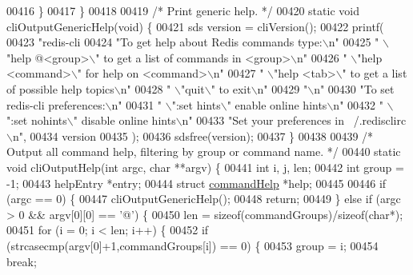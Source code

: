 \begin{DoxyCode}
{{{{{{{{{{{00416     \}
00417 \}
00418 
00419 \textcolor{comment}{/* Print generic help. */}
00420 \textcolor{keyword}{static} \textcolor{keywordtype}{void} cliOutputGenericHelp(\textcolor{keywordtype}{void}) \{
00421     sds version = cliVersion();
00422     printf(
00423         \textcolor{stringliteral}{"redis-cli %
00424         \textcolor{stringliteral}{"To get help about Redis commands type:\(\backslash\)n"}
00425         \textcolor{stringliteral}{"      \(\backslash\)"help @<group>\(\backslash\)" to get a list of commands in <group>\(\backslash\)n"}
00426         \textcolor{stringliteral}{"      \(\backslash\)"help <command>\(\backslash\)" for help on <command>\(\backslash\)n"}
00427         \textcolor{stringliteral}{"      \(\backslash\)"help <tab>\(\backslash\)" to get a list of possible help topics\(\backslash\)n"}
00428         \textcolor{stringliteral}{"      \(\backslash\)"quit\(\backslash\)" to exit\(\backslash\)n"}
00429         \textcolor{stringliteral}{"\(\backslash\)n"}
00430         \textcolor{stringliteral}{"To set redis-cli preferences:\(\backslash\)n"}
00431         \textcolor{stringliteral}{"      \(\backslash\)":set hints\(\backslash\)" enable online hints\(\backslash\)n"}
00432         \textcolor{stringliteral}{"      \(\backslash\)":set nohints\(\backslash\)" disable online hints\(\backslash\)n"}
00433         \textcolor{stringliteral}{"Set your preferences in ~/.redisclirc\(\backslash\)n"},
00434         version
00435     );
00436     sdsfree(version);
00437 \}
00438 
00439 \textcolor{comment}{/* Output all command help, filtering by group or command name. */}
00440 \textcolor{keyword}{static} \textcolor{keywordtype}{void} cliOutputHelp(\textcolor{keywordtype}{int} argc, \textcolor{keywordtype}{char} **argv) \{
00441     \textcolor{keywordtype}{int} i, j, len;
00442     \textcolor{keywordtype}{int} group = -1;
00443     helpEntry *entry;
00444     \textcolor{keyword}{struct} \hyperlink{structcommandHelp}{commandHelp} *help;
00445 
00446     \textcolor{keywordflow}{if} (argc == 0) \{
00447         cliOutputGenericHelp();
00448         \textcolor{keywordflow}{return};
00449     \} \textcolor{keywordflow}{else} \textcolor{keywordflow}{if} (argc > 0 && argv[0][0] == \textcolor{stringliteral}{'@'}) \{
00450         len = \textcolor{keyword}{sizeof}(commandGroups)/\textcolor{keyword}{sizeof}(\textcolor{keywordtype}{char}*);
00451         \textcolor{keywordflow}{for} (i = 0; i < len; i++) \{
00452             \textcolor{keywordflow}{if} (strcasecmp(argv[0]+1,commandGroups[i]) == 0) \{
00453                 group = i;
00454                 \textcolor{keywordflow}{break};
}}}}}}}}}}}}
\end{DoxyCode}
